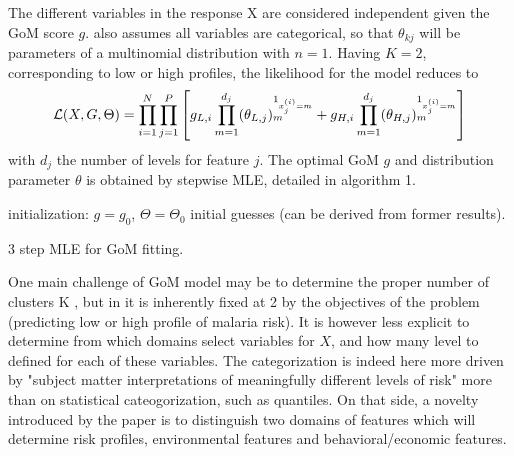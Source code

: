 \documentclass[twoside]{article}
\begin{document}
The different variables in the response X are considered independent given the GoM score $g$. \cite{malaria} also assumes all variables are categorical, so that $\theta_{k j}$ will be parameters of a multinomial distribution with $n=1$. Having $K=2$, corresponding to low or high profiles, the likelihood for the model reduces to
\begin{equation}
\mathcal{L}(X, G, \Theta) = \prod_{i=1}^N \prod_{j=1}^P \left[ g_{L, i} \* \prod_{m = 1}^{d_j} (\theta_{L, j})_m^{1_{x^{(i)}_j = m}} + g_{H, i} \* \prod_{m = 1}^{d_j} (\theta_{H, j})_m^{1_{x^{(i)}_j = m}} \right]
\end{equation}
with $d_j$ the number of levels for feature $j$. The optimal GoM $g$ and distribution parameter $\theta$ is obtained by stepwise MLE, detailed in algorithm 1.

\vspace{.2 in}

\begin{algorithm}[H]
 initialization: $g = g_0$, $\Theta = \Theta_0$ initial guesses (can be derived from former results).\\
 \caption{3 step MLE for GoM fitting.}
\end{algorithm}
\vspace{.2 in}

One main challenge of GoM model may be to determine the proper number of clusters K \cite{mixmemint}, but in \cite{malaria} it is inherently fixed at 2 by the objectives of the problem (predicting low or high profile of malaria risk). It is however less explicit to determine from which domains select variables for $X$, and how many level to defined for each of these variables. The categorization is indeed here more driven by "subject matter interpretations of meaningfully different levels of risk" more than on statistical cateogorization, such as quantiles. On that side, a novelty introduced by the paper is to distinguish two domains of features which will determine risk profiles, environmental features and behavioral/economic features.\\
\end{document}
